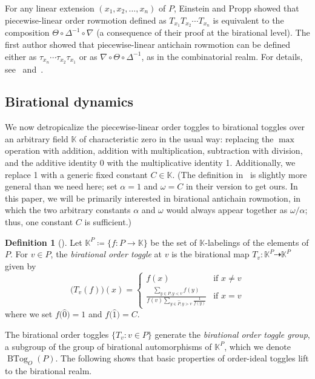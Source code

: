 \documentclass[10pt]{amsart}
\theoremstyle{definition}
\newtheorem{defi}[theo]{Definition}
\newcommand{\defn}[1]{\emph{#1}}
\newcommand{\kk}{\mathbb{K}}
\newcommand{\dra}{\dashrightarrow}
\newcommand{\down}{\nabla}
\newcommand{\up}{\Delta}
\DeclareMathOperator{\btog}{BTog}
\begin{document}
For any linear extension $(x_1,x_2,\dots,x_n)$ of $P$,
Einstein and Propp showed that piecewise-linear order rowmotion
defined as $T_{x_1}T_{x_2}\cdots T_{x_n}$
is equivalent to the composition $\Theta \circ \up^{-1} \circ \down$ (a consequence of
their proof at the birational level). 
The first author showed that piecewise-linear antichain rowmotion can be defined either as
$\tau_{x_n}\cdots \tau_{x_2}\tau_{x_1}$ or as
$\down\circ\Theta \circ \up^{-1}$, as in the combinatorial realm.
For details, see~\cite[\S~4, \S~6]{einpropp} and~\cite[\S~3.3, \S~3.4]{antichain-toggling}.


\subsection{Birational dynamics}

We now detropicalize the piecewise-linear order toggles to birational
toggles over an arbitrary field $\kk$ of characteristic zero in the usual way: replacing
the $\max$ operation with addition, 
addition with multiplication, 
subtraction with division, and
the additive identity 0 with the multiplicative identity 1.
Additionally, we replace 1 with a generic fixed constant $C\in\kk$.
(The definition
in~\cite{einpropp} is slightly more general than we need here; set $\alpha=1$ and
$\omega=C$ in their version to get ours. In this paper, we will be primarily interested in
birational antichain rowmotion, in which the two arbitrary constants $\alpha$ and $\omega$
would always appear together as $\omega/\alpha$; thus, one constant $C$ is sufficient.) 

\begin{defi}[{\cite[Definition~5.1]{einpropp}}]
Let $\kk^P\coloneqq \{f:P\rightarrow \kk \}$ be the set of $\kk$-labelings of the elements of $P$.
For $v\in P$, the \defn{birational order toggle} at $v$ is the
birational map
$T_v: \kk^P \dra \kk^P$ given by
\[
 \big(T_v(f)\big)(x) =
\begin{cases}
f(x) &\text{if }x\not=v\\[4pt]
\frac{\sum\limits_{y\in\widehat{P},y\lessdot v} f(y)}
{f(v) \sum\limits_{y\in\widehat{P},y\gtrdot v} \frac{1}{f(y)}}
&\text{if }x=v\end{cases}
\]
where we set $f\big(\widehat{0}\big)=1$ and $f\big(\widehat{1}\big)=C$.
\end{defi}
The birational order toggles $\{T_v: v\in P\}$
generate the \defn{birational order toggle group}, a subgroup of the group of
birational automorphisms of $\kk^{P}$, which we denote $\btog_O(P)$.
The following shows that basic properties of order-ideal toggles lift to the birational realm.
\end{document}
